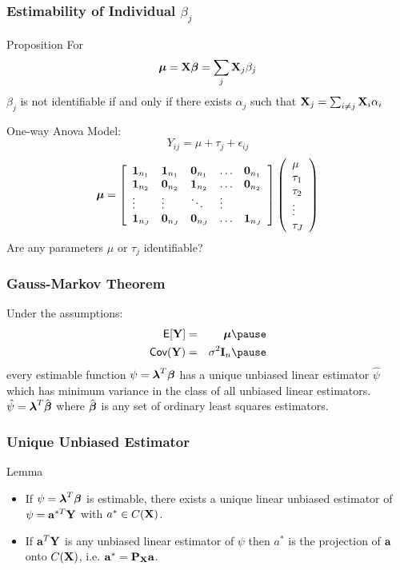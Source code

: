 \documentclass{beamer}\usepackage[]{graphicx}\usepackage[]{color}
\begin{document}
\begin{frame}
  \frametitle{Estimability of Individual $\beta_j$}
  \begin{block}{Proposition}
For    $$\boldsymbol{\mu} = \mathbf{X} \boldsymbol{\beta} = \sum_j \mathbf{X}_j \beta_j$$
$\beta_j$ is not identifiable  if and only if there exists $\alpha_j$
such that $\mathbf{X}_j = \sum_{i \neq j} \mathbf{X}_i \alpha_i$
  \end{block} \pause
One-way Anova Model:
$$Y_{ij} = \mu + \tau_j + \epsilon_{ij}$$
  $$ \boldsymbol{\mu} =  \left[
    \begin{array}{lllll}
\mathbf{1}_{n_1} & \mathbf{1}_{n_1} & \mathbf{0}_{n_1} &  \ldots & \mathbf{0}_{n_1} \\
\mathbf{1}_{n_2} & \mathbf{0}_{n_2} & \mathbf{1}_{n_2} &  \ldots & \mathbf{0}_{n_2} \\
\vdots & \vdots & \ddots & \vdots \\
\mathbf{1}_{n_J} & \mathbf{0}_{n_J} & \mathbf{0}_{n_J} &  \ldots & \mathbf{1}_{n_J} \\
    \end{array} \right]
 \left(   \begin{array}{l}
      \mu \\
      \tau_1 \\
   \tau_2 \\
 \vdots \\
\tau_J
    \end{array} \right)
$$\pause
Are any parameters $\mu$ or $\tau_j$ identifiable?
\end{frame}
\begin{frame}
  \frametitle{Gauss-Markov Theorem}
  \begin{theorem}

  Under the assumptions:
  \begin{eqnarray*}
    \E[\Y] & = & \mub \pause \\
    \Cov(\Y) & = &\sigma^2 \I_n \pause
  \end{eqnarray*}
every estimable function $\psi = \boldsymbol{\lambda}^T\boldsymbol{\beta}$ has a unique unbiased
linear estimator $\hat{\psi}$ which has minimum variance in the class
of all unbiased linear estimators. \pause  $\hat{\psi} = \boldsymbol{\lambda}^T\hat{\boldsymbol{\beta}}$
where $\hat{\boldsymbol{\beta}}$ is any set of ordinary least squares
estimators.

  \end{theorem}
\end{frame}
\begin{frame}
  \frametitle{Unique Unbiased Estimator}
  \begin{block}{Lemma}
    \begin{itemize}
    \item
    If   $\psi = \boldsymbol{\lambda}^T \boldsymbol{\beta}$ is estimable, there exists a unique
    linear unbiased estimator of $\psi = \mathbf{a}^{*T}\mathbf{Y}$ with $a^* \in
    C(\mathbf{X})$. \pause
\item If $\mathbf{a}^T\mathbf{Y}$ is any unbiased linear estimator of $\psi$
    then $a^*$ is the projection of $\mathbf{a}$ onto $C(\mathbf{X})$, i.e. $\mathbf{a}^* =
    \mathbf{P}_{\mathbf{X}} \mathbf{a}$.
    \end{itemize}

  \end{block}
      \end{frame}
\end{document}
